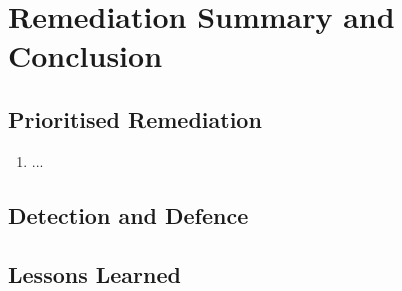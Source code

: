\section{Remediation Summary and Conclusion}
\subsection{Prioritised Remediation}
\begin{enumerate}
\item ...
\end{enumerate}
\subsection{Detection and Defence}
\subsection{Lessons Learned}
